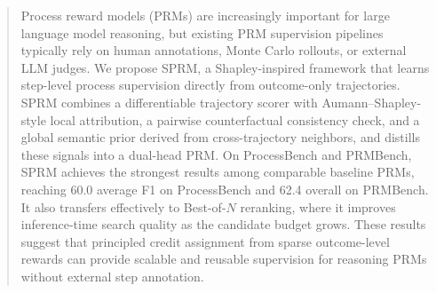 \begin{abstract}
Process reward models (PRMs) are increasingly important for large language
model reasoning, but existing PRM supervision pipelines typically rely on
human annotations, Monte Carlo rollouts, or external LLM judges.
We propose SPRM, a Shapley-inspired framework that learns step-level process
supervision directly from outcome-only trajectories.
SPRM combines a differentiable trajectory scorer with Aumann--Shapley-style
local attribution, a pairwise counterfactual consistency check, and a global
semantic prior derived from cross-trajectory neighbors, and distills these
signals into a dual-head PRM.
On ProcessBench and PRMBench, SPRM achieves the strongest results among
comparable baseline PRMs, reaching 60.0 average F1 on ProcessBench and 62.4
overall on PRMBench.
It also transfers effectively to Best-of-\(N\) reranking, where it improves
inference-time search quality as the candidate budget grows.
These results suggest that principled credit assignment from sparse
outcome-level rewards can provide scalable and reusable supervision for
reasoning PRMs without external step annotation.
\end{abstract}
